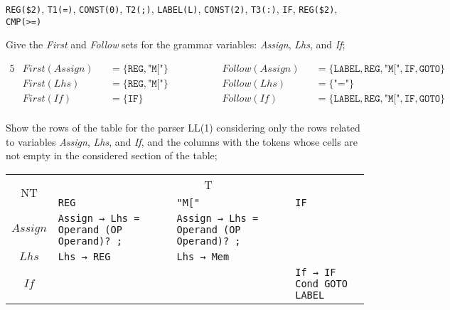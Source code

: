 \documentclass[docid=2020]{comp_test1}
\begin{document}
\ansseparator

\noindent
\texttt{REG(\$2)}, \texttt{T1(=)}, \texttt{CONST(0)}, \texttt{T2(;)}, \texttt{LABEL(L)}, \texttt{CONST(2)}, \texttt{T3(:)}, \texttt{IF}, \texttt{REG(\$2)}, \texttt{CMP(>=)}

\question
Give the \textit{First} and \textit{Follow} sets for the grammar variables: \textit{Assign}, \textit{Lhs}, and \textit{If};

\ansseparator

\vspace{-2.0em}
\begin{alignat*}{5}
    & First (Assign) &&= \{ \texttt{REG}, \texttt{"M["} \} && ~~~~~~~~~~ && Follow(Assign) &&= \{ \texttt{LABEL}, \texttt{REG}, \texttt{"M["}, \texttt{IF}, \texttt{GOTO} \} \\
    & First (Lhs)    &&= \{ \texttt{REG}, \texttt{"M["} \} && ~~~~~~~~~~ && Follow(Lhs)    &&= \{ \texttt{"="}                                                            \} \\
    & First (If)     &&= \{ \texttt{IF}                 \} && ~~~~~~~~~~ && Follow(If)     &&= \{ \texttt{LABEL}, \texttt{REG}, \texttt{"M["}, \texttt{IF}, \texttt{GOTO} \} \\
\end{alignat*}
\vspace{-3.0em}

\question
Show the rows of the table for the parser LL(1) considering only the rows related to variables \textit{Assign}, \textit{Lhs}, and \textit{If}, and the columns with the tokens whose cells are not empty in the considered section of the table;

\ansseparator

\begin{center}
    \small
    \begin{tabular}{@{} c | p{44mm} | p{44mm} | p{44mm} @{}}
        \multirow{2}{*}{NT} & \multicolumn{3}{c}{T} \\ \cline{2-4}
        & \texttt{REG} & \texttt{"M["} & \texttt{IF} \\ \hline
        $Assign$ & \texttt{Assign → Lhs = Operand (OP Operand)? ;} & \texttt{Assign → Lhs = Operand (OP Operand)? ;} & \\ \hline
        $Lhs$ & \texttt{Lhs → REG} & \texttt{Lhs → Mem} & \\ \hline
        $If$ & & & \texttt{If → IF Cond GOTO LABEL}
    \end{tabular}
\end{center}
\end{document}
